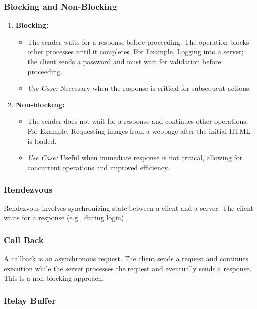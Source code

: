 \subsubsection{Blocking and Non-Blocking}
\begin{enumerate}
    \item \textbf{Blocking:}
    \begin{itemize}[itemsep=0.5pt,topsep=0pt]
        \item The sender waits for a response before proceeding. The operation blocks other processes until it completes. For Example, Logging into a server; the client sends a password and must wait for validation before proceeding.
        \item \textit{Use Case:} Necessary when the response is critical for subsequent actions.
    \end{itemize}
    
    \item \textbf{Non-blocking:}
    \begin{itemize}[itemsep=0.5pt,topsep=0pt]	
        \item The sender does not wait for a response and continues other operations. For Example, Requesting images from a webpage after the initial HTML is loaded.
        \item \textit{Use Case:} Useful when immediate response is not critical, allowing for concurrent operations and improved efficiency.
    \end{itemize}
\end{enumerate}

\subsubsection{Rendezvous}

Rendezvous involves synchronizing state between a client and a server. The client waits for a response (e.g., during login).

\subsubsection{Call Back}

A callback is an asynchronous request. The client sends a request and continues execution while the server processes the request and eventually sends a response.  This is a non-blocking approach.

\subsubsection{Relay Buffer}

